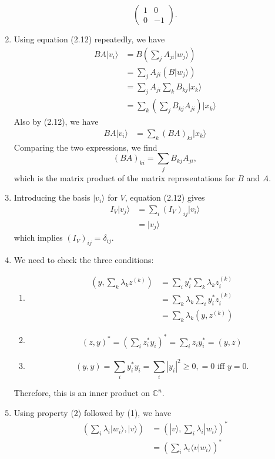\documentclass[12 pt]{article}
\newcommand{\C}{\mathbb{C}}
\begin{document}
\begin{enumerate}
$$\begin{pmatrix}
	1&0\\0&-1
\end{pmatrix}.$$
\item Using equation (2.12) repeatedly, we have 
	\begin{align*}
	BA|v_i\rangle &= B(\sum_j A_{ji}|w_j\rangle) \\
	&=\sum_j A_{ji}(B|w_j\rangle) \\
	&=\sum_j A_{ji} \sum_k B_{kj}|x_k\rangle \\
	&=\sum_k (\sum_j B_{kj}A_{ji})|x_k\rangle 
	\end{align*}
Also by (2.12), we have 
	\begin{align*}
	BA|v_i\rangle &=\sum_k (BA)_{ki}|x_k\rangle\end{align*}
Comparing the two expressions, we find
$$(BA)_{ki}=\sum_j B_{kj}A_{ji},$$
which is the matrix product of the matrix representations for $B$ and $A$.
\item Introducing the basis $|v_i\rangle$ for $V$, equation (2.12) gives
\begin{align*}
	I_V|v_j\rangle &=\sum_i (I_V)_{ij}|v_i\rangle \\
	&=|v_j\rangle
\end{align*}
which implies $(I_V)_{ij}=\delta_{ij}$.
\item We need to check the three conditions:
\begin{enumerate}[(1)]
\item \begin{align*}
	(y,\sum_k \lambda_k z^{(k)})&=\sum_i y_i^* \sum_k \lambda_k z_i^{(k)} \\
	&=\sum_k \lambda_k \sum_i y_i^*z_i^{(k)} \\
	&=\sum_k \lambda_k (y,z^{(k)})
\end{align*}
\item \begin{align*}
	(z,y)^*=(\sum_i z_i^* y_i)^*=\sum_i z_i y_i^*=(y,z)
\end{align*}
\item $$(y,y)=\sum_i y_i^* y_i = \sum_i|y_i|^2 \geq 0, =0\text{ iff } y=0.$$
\end{enumerate}
Therefore, this is an inner product on $\C^n$.
\item Using property (2) followed by (1), we have
\begin{align*}
	(\sum_i \lambda_i|w_i\rangle,|v\rangle)&=(|v\rangle,\sum_i \lambda_i|w_i\rangle)^* \\
	&=(\sum_i\lambda_i \langle v|w_i\rangle)^*\\

\end{align*}
\end{enumerate}
\end{document}
